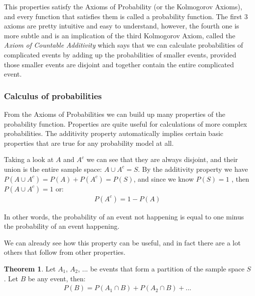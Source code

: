 \documentclass[
  oneside,
  11pt, a4paper,
  footinclude=true,
  headinclude=true,
  cleardoublepage=empty
]{scrbook}
\theoremstyle{definition}
\theoremstyle{definition}
\newtheorem{theorem}{Theorem}[section]
\begin{document}
                This properties satisfy the Axioms of Probability (or the Kolmogorov Axioms), and every function that satisfies them is called a probability function. The first 3 axioms are pretty intuitive and easy to understand, however, the fourth one is more subtle and is an implication of the third Kolmogorov Axiom, called the \emph{Axiom of Countable Additivity} which says that we can calculate probabilities of complicated events by adding up the probabilities of smaller events, provided those smaller events are disjoint and together contain the entire complicated event.
        
        \subsubsection{Calculus of probabilities}
            
            From the Axioms of Probabilities we can build up many properties of the probability function. Properties are quite useful for calculations of more complex probabilities. The additivity property automatically implies certain basic properties that are true for any probability model at all.
            
            Taking a look at $A$ and $A^c$ we can see that they are always disjoint, and their union is the entire sample space: $A \cup A^c = S$. By the additivity property we have $P(A \cup A^c) = P(A) + P(A^c) = P(S)$, and since we know $P(S) = 1$ , then $P(A \cup A^c) = 1$ or:
            \begin{align}
                P(A^c) = 1 - P(A)
            \end{align}{}
            
            In other words, the probability of an event not happening is equal to one minus the probability of an event happening.
            
            We can already see how this property can be useful, and in fact there are a lot others that follow from other properties.
            
            \begin{theorem}{Let $A_1$, $A_2$, ... be events that form a partition of the sample space $S$. Let $B$ be any event, then:}
                \begin{align*}
                    P(B) = P(A_1 \cap B) + P(A_2 \cap B) + ...
                \end{align*}{}
            \end{theorem}
            
\end{document}
